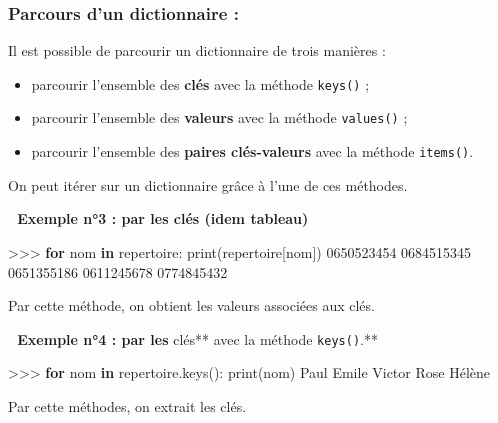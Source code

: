 \documentclass[
]{article}
\newenvironment{Shaded}{}{}
\newcommand{\BuiltInTok}[1]{#1}
\newcommand{\ControlFlowTok}[1]{\textcolor[rgb]{0.00,0.44,0.13}{\textbf{#1}}}
\newcommand{\KeywordTok}[1]{\textcolor[rgb]{0.00,0.44,0.13}{\textbf{#1}}}
\newcommand{\NormalTok}[1]{#1}
\newcommand{\OperatorTok}[1]{\textcolor[rgb]{0.40,0.40,0.40}{#1}}
\providecommand{\tightlist}{%
  \setlength{\itemsep}{0pt}\setlength{\parskip}{0pt}}
\begin{document}
\hypertarget{parcours-dun-dictionnaire}{%
\subsubsection{Parcours d'un dictionnaire
:}\label{parcours-dun-dictionnaire}}

Il est possible de parcourir un dictionnaire de trois manières :

\begin{itemize}
\tightlist
\item
  parcourir l'ensemble des \textbf{clés} avec la méthode \texttt{keys()}
  ;
\item
  parcourir l'ensemble des \textbf{valeurs} avec la méthode
  \texttt{values()} ;
\item
  parcourir l'ensemble des \textbf{paires clés-valeurs} avec la méthode
  \texttt{items()}.
\end{itemize}

On peut itérer sur un dictionnaire grâce à l'une de ces méthodes.

\textbf{📎 Exemple n°3 : par les clés (idem tableau)}

\begin{Shaded}
\begin{Highlighting}[]
\OperatorTok{\textgreater{}\textgreater{}\textgreater{}} \ControlFlowTok{for}\NormalTok{ nom }\KeywordTok{in}\NormalTok{ repertoire:}
       \BuiltInTok{print}\NormalTok{(repertoire[nom])}
\NormalTok{0650523454}
\NormalTok{0684515345}
\NormalTok{0651355186}
\NormalTok{0611245678}
\NormalTok{0774845432}
\end{Highlighting}
\end{Shaded}

Par cette méthode, on obtient les valeurs associées aux clés.

\textbf{📎 Exemple n°4 : par les }clés** avec la méthode
\texttt{keys()}.**

\begin{Shaded}
\begin{Highlighting}[]
\OperatorTok{\textgreater{}\textgreater{}\textgreater{}} \ControlFlowTok{for}\NormalTok{ nom }\KeywordTok{in}\NormalTok{ repertoire.keys():}
        \BuiltInTok{print}\NormalTok{(nom)}
\NormalTok{Paul}
\NormalTok{Emile}
\NormalTok{Victor}
\NormalTok{Rose}
\NormalTok{Hélène}
\end{Highlighting}
\end{Shaded}

Par cette méthodes, on extrait les clés.
\end{document}
